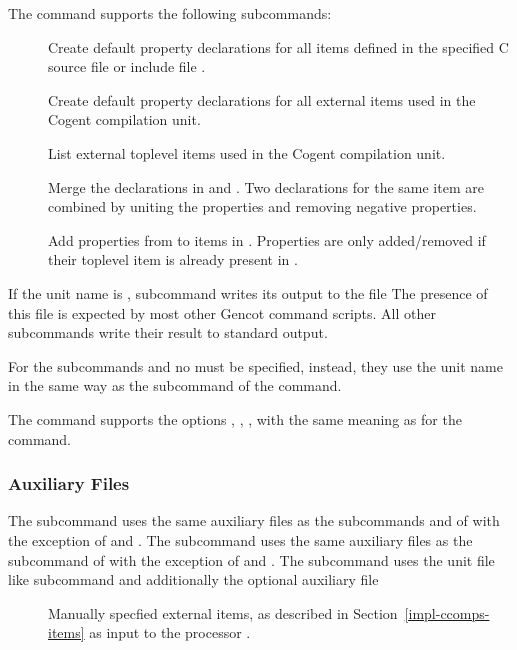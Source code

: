 The  command supports the following subcommands:
\begin{description}
\item[] Create default property declarations for all items defined in the specified C source file
or include file . 

\item[] Create default property declarations for all external items used in the Cogent compilation 
unit. 

\item[] List external toplevel items used in the Cogent compilation unit. 

\item[] Merge the declarations in  and . Two declarations for the 
same item are combined by uniting the properties and removing negative properties.

\item[] Add properties from  to items in . Properties are only added/removed
if their toplevel item is already present in .

\end{description}

If the unit name is , subcommand  writes its output to the file 
The presence of this file is expected by most other Gencot command scripts. All other subcommands write their result to 
standard output.

For the subcommands  and  no  must be specified, instead, they use the unit name
in the same way as the subcommand  of the  command.

The  command supports the options , , ,  with the same meaning as
for the  command.

\subsubsection{Auxiliary Files}

The subcommand  uses the same auxiliary files as the subcommands  and  of  with
the exception of  and .
The subcommand  uses the same auxiliary files as the subcommand  of  with the exception
of  and .
The subcommand  uses the unit file  like subcommand  and additionally
the optional auxiliary file 
\begin{description}
\item[] Manually specfied external items, as described in Section~\ref{impl-ccomps-items} as
input to the processor .
\end{description}

